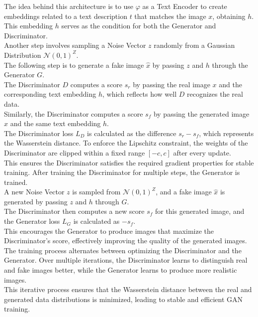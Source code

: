 The idea behind this architecture is to use $\varphi$ as a Text Encoder to create embeddings 
related to a text description $t$ that matches the image $x$, obtaining $h$. 
This embedding $h$ serves as the condition for both the Generator and Discriminator. \\
Another step involves sampling a Noise Vector $z$ randomly from 
a Gaussian Distribution $\mathcal{N}(0, 1)^Z$. \\
The following step is to generate a fake image $\hat{x}$ by passing $z$ 
and $h$ through the Generator $G$. \\
The Discriminator $D$ computes a score $s_r$ by passing the real image $x$ and 
the corresponding text embedding $h$, which reflects how well $D$ recognizes 
the real data. \\
Similarly, the Discriminator computes a score $s_f$ by passing 
the generated image $\hat{x}$ and the same text embedding $h$.\\
The Discriminator loss $L_D$ is calculated as the difference $s_r - s_f$, which represents 
the Wasserstein distance. To enforce the Lipschitz constraint, the weights of 
the Discriminator are clipped within a fixed range $[-c, c]$ after every update. \\
This ensures the Discriminator satisfies the required gradient properties for stable training.
After training the Discriminator for multiple steps, the Generator is trained. \\
A new Noise Vector $z$ is sampled from $\mathcal{N}(0, 1)^Z$, and a fake image $\hat{x}$ 
is generated by passing $z$ and $h$ through $G$. \\
The Discriminator then computes a new score $s_f$ for this generated image, 
and the Generator loss $L_G$ is calculated as $-s_f$. \\
This encourages the Generator to produce images that maximize the Discriminator's score, 
effectively improving the quality of the generated images. \\
The training process alternates between optimizing the Discriminator and the Generator. 
Over multiple iterations, the Discriminator learns to distinguish real and fake images better, 
while the Generator learns to produce more realistic images. \\
This iterative process ensures that the Wasserstein distance between the real and generated 
data distributions is minimized, leading to stable and efficient GAN training.
